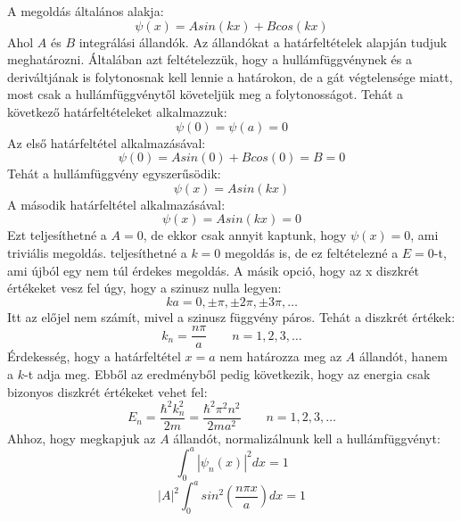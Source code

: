 \documentclass[../main.tex]{subfiles}
\begin{document}
A megoldás általános alakja:
\begin{equation}
    \psi(x) = A sin(kx) + B cos(kx)
\end{equation}
Ahol $A$ és $B$ integrálási állandók. Az állandókat a határfeltételek alapján tudjuk meghatározni. Általában azt feltételezzük, hogy a hullámfüggvénynek és a deriváltjának is folytonosnak kell lennie a határokon,
de a gát végtelensége miatt, most csak a hullámfüggvénytől követeljük meg a folytonosságot. Tehát a következő határfeltételeket alkalmazzuk:
\begin{equation}
    \psi(0) = \psi(a) = 0
\end{equation}
Az első határfeltétel alkalmazásával:
\begin{equation}
    \psi(0) = A sin(0) + B cos(0) = B = 0
\end{equation}
Tehát a hullámfüggvény egyszerűsödik:
\begin{equation}
    \psi(x) = A sin(kx)
\end{equation}
A második határfeltétel alkalmazásával:
\begin{equation}
    \psi(x) = A sin(kx) = 0
\end{equation}
Ezt teljesíthetné a $A = 0$, de ekkor csak annyit kaptunk, hogy $\psi (x) = 0$, ami triviális megoldás. teljesíthetné a $k = 0$ megoldás is, de ez feltételezné a $E = 0$-t, ami újból egy nem túl érdekes megoldás.
 A másik opció, hogy az x diszkrét értékeket vesz fel úgy, hogy a szinusz nulla legyen:
\begin{equation}
    k a = 0, \pm \pi, \pm 2\pi, \pm 3\pi, \ldots
\end{equation}
Itt az előjel nem számít, mivel a szinusz függvény páros. Tehát a diszkrét értékek:
\begin{equation}
    k_n = \frac{n \pi}{a} \quad \quad n = 1, 2, 3, \ldots
\end{equation}
Érdekesség, hogy a határfeltétel $x = a$ nem határozza meg az $A$ állandót, hanem a $k$-t adja meg. Ebből az eredményből pedig következik, hogy az energia csak bizonyos diszkrét értékeket vehet fel:
\begin{equation}
    E_n = \frac{\hbar^2 k_n^2}{2m} = \frac{\hbar^2 \pi^2 n^2}{2m a^2} \quad \quad n = 1, 2, 3, \ldots
\end{equation}
Ahhoz, hogy megkapjuk az $A$ állandót, normalizálnunk kell a hullámfüggvényt:
\begin{equation}
    \int_0^a |\psi_n(x)|^2 dx = 1
\end{equation}
\begin{equation}
    |A|^2 \int_0^a sin^2\left(\frac{n \pi x}{a}\right) dx = 1
\end{equation}
\end{document}
